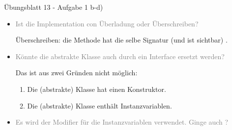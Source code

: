\begin{frame}[c,fragile]{Übungsblatt 13 - Aufgabe 1 b-d)}
\small\begin{itemize}[<+(1)->]
    \itemsep5.5pt
    \item \textcolor{gray}{Ist die Implementation con  Überladung oder Überschreiben?}\par\pause
    Überschreiben: die  Methode hat die selbe Signatur (und ist sichtbar) .
    \item \textcolor{gray}{Könnte die abstrakte Klasse auch durch ein Interface ersetzt werden?}\par
    \pause Das ist aus zwei Gründen nicht möglich: \begin{enumerate}
        \item<6-> Die (abstrakte) Klasse hat einen Konstruktor.
        \item<7-> Die (abstrakte) Klasse enthält Instanzvariablen.
    \end{enumerate}
    \item<9-> \textcolor{gray}{Es wird der Modifier  für die Instanzvariablen verwendet. Ginge auch ?}\par
\end{itemize}
\end{frame}

